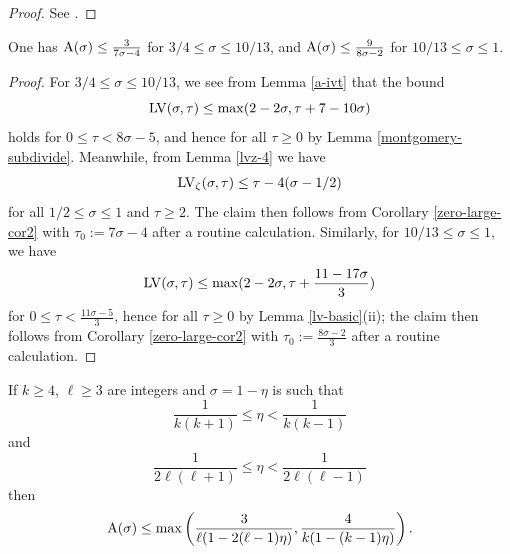 \begin{proof} See \cite[(11.95)]{ivic}.
\end{proof}

\begin{corollary}\label{ivic-near-34}\cite[Theorem 11.5]{ivic}  One has $\mathrm{A}(\sigma) \leq \frac{3}{7\sigma-4}$ for $3/4 \leq \sigma \leq 10/13$, and $\mathrm{A}(\sigma) \leq \frac{9}{8\sigma-2}$ for $10/13 \leq \sigma \leq 1$.
\end{corollary}

\begin{proof}  For $3/4 \leq \sigma \leq 10/13$, we see from Lemma \ref{a-ivt} that the bound
$$ \mathrm{LV}(\sigma,\tau) \leq \max(2-2\sigma, \tau + 7 - 10\sigma )$$
holds for $0 \leq \tau < 8\sigma-5$, and hence for all $\tau \geq 0$ by Lemma \ref{montgomery-subdivide}.  Meanwhile, from Lemma \ref{lvz-4} we have
$$\mathrm{LV}_\zeta(\sigma,\tau) \leq \tau - 4 (\sigma-1/2)$$
for all $1/2 \leq \sigma \leq 1$ and $\tau \geq 2$. The claim then follows from Corollary
\ref{zero-large-cor2} with $\tau_0 := 7\sigma-4$ after a routine calculation.  Similarly, for $10/13 \leq \sigma \leq 1$, we have
$$ \mathrm{LV}(\sigma,\tau) \leq \max(2-2\sigma, \tau + \frac{11 - 17 \sigma}{3} )$$
for $0 \leq \tau < \frac{11\sigma-5}{3}$, hence for all $\tau \geq 0$ by Lemma \ref{lv-basic}(ii); the claim then follows from Corollary
\ref{zero-large-cor2} with $\tau_0 := \frac{8\sigma-2}{3}$ after a routine calculation.
\end{proof}


\begin{theorem}\label{pintz-density}\cite[Theorem 1]{pintz_density_2023}  If $k \geq 4$, $\ell \geq 3$ are integers and $\sigma = 1-\eta$ is such that
\begin{equation}\label{eta-b}
    \frac{1}{k(k+1)} \leq \eta < \frac{1}{k(k-1)}
\end{equation}
and
\begin{equation}\label{eta-l}
 \frac{1}{2\ell(\ell+1)} \leq \eta < \frac{1}{2\ell(\ell-1)}
\end{equation}
then
$$ \mathrm{A}(\sigma) \leq \max\left( \frac{3}{\ell(1-2(\ell-1)\eta)}, \frac{4}{k(1-(k-1)\eta)}\right).$$
\end{theorem}
\literature
{}

